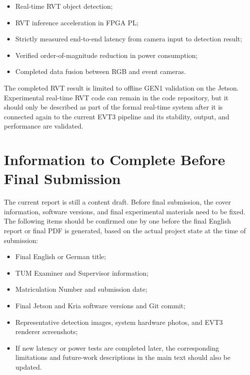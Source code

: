 \begin{itemize}
    \item Real-time RVT object detection;
    \item RVT inference acceleration in FPGA PL;
    \item Strictly measured end-to-end latency from camera input to detection result;
    \item Verified order-of-magnitude reduction in power consumption;
    \item Completed data fusion between RGB and event cameras.
\end{itemize}

The completed RVT result is limited to offline GEN1 validation on the Jetson. Experimental real-time RVT code can remain in the code repository, but it should only be described as part of the formal real-time system after it is connected again to the current EVT3 pipeline and its stability, output, and performance are validated.

\section{Information to Complete Before Final Submission}

The current report is still a content draft. Before final submission, the cover information, software versions, and final experimental materials need to be fixed. The following items should be confirmed one by one before the final English report or final PDF is generated, based on the actual project state at the time of submission:

\begin{itemize}
    \item Final English or German title;
    \item TUM Examiner and Supervisor information;
    \item Matriculation Number and submission date;
    \item Final Jetson and Kria software versions and Git commit;
    \item Representative detection images, system hardware photos, and EVT3 renderer screenshots;
    \item If new latency or power tests are completed later, the corresponding limitations and future-work descriptions in the main text should also be updated.
\end{itemize}
